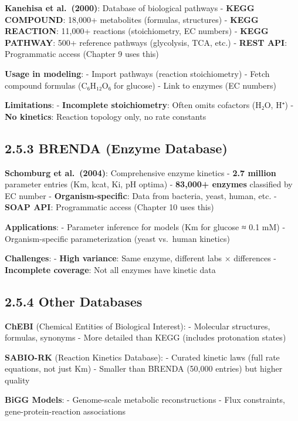 \textbf{Kanehisa et al.~(2000)}: Database of biological pathways -
\textbf{KEGG COMPOUND}: 18,000+ metabolites (formulas, structures) -
\textbf{KEGG REACTION}: 11,000+ reactions (stoichiometry, EC numbers) -
\textbf{KEGG PATHWAY}: 500+ reference pathways (glycolysis, TCA, etc.) -
\textbf{REST API}: Programmatic access (Chapter 9 uses this)

\textbf{Usage in modeling}: - Import pathways (reaction stoichiometry) -
Fetch compound formulas (C₆H₁₂O₆ for glucose) - Link to enzymes (EC
numbers)

\textbf{Limitations}: - \textbf{Incomplete stoichiometry}: Often omits
cofactors (H₂O, H⁺) - \textbf{No kinetics}: Reaction topology only, no
rate constants

\hypertarget{brenda-enzyme-database}{%
\subsection{2.5.3 BRENDA (Enzyme
Database)}\label{brenda-enzyme-database}}

\textbf{Schomburg et al.~(2004)}: Comprehensive enzyme kinetics -
\textbf{2.7 million} parameter entries (Km, kcat, Ki, pH optima) -
\textbf{83,000+ enzymes} classified by EC number -
\textbf{Organism-specific}: Data from bacteria, yeast, human, etc. -
\textbf{SOAP API}: Programmatic access (Chapter 10 uses this)

\textbf{Applications}: - Parameter inference for models (Km for glucose
≈ 0.1 mM) - Organism-specific parameterization (yeast vs.~human
kinetics)

\textbf{Challenges}: - \textbf{High variance}: Same enzyme, different
labs × differences - \textbf{Incomplete coverage}: Not all enzymes
have kinetic data

\hypertarget{other-databases}{%
\subsection{2.5.4 Other Databases}\label{other-databases}}

\textbf{ChEBI} (Chemical Entities of Biological Interest): - Molecular
structures, formulas, synonyms - More detailed than KEGG (includes
protonation states)

\textbf{SABIO-RK} (Reaction Kinetics Database): - Curated kinetic laws
(full rate equations, not just Km) - Smaller than BRENDA (50,000
entries) but higher quality

\textbf{BiGG Models}: - Genome-scale metabolic reconstructions - Flux
constraints, gene-protein-reaction associations

